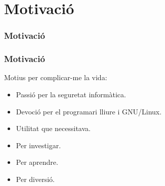 \documentclass{beamer}
\begin{document}




\section{Motivació}
\begin{frame}
	\frametitle{Motivació}
\end{frame}

\begin{frame}
	\frametitle{Motivació}
	\begin{block}{Motius per complicar-me la vida:}
		\begin{itemize}
			\item<1-> Passió per la seguretat informàtica.
			\item<2-> Devoció per el programari lliure i GNU/Linux.
			\item<3-> Utilitat que necessitava.
			\item<4-> Per investigar.
			\item<5-> Per aprendre.
			\item<6-> Per diversió.
		\end{itemize}
	\end{block}
\end{frame}
\end{document}
